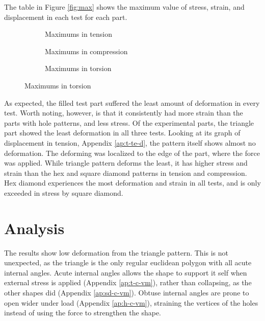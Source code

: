 \documentclass[12pt, letterpaper]{article}
\begin{document}
The table in Figure \ref{fig:max} shows the maximum value of stress, strain, and displacement in each test for each part. 

\begin{figure}[H]
	\centering
	\caption{Maximum values reached for displacement, stress, and strain, per test and part}
	\label{fig:max}
	\begin{subfigure}[b]{0.8\linewidth}
	\label{tab:tension}
	\caption{Maximums in tension}
	\end{subfigure}
	\begin{subfigure}[b]{0.8\linewidth}
	\label{tab:compression}
	\caption{Maximums in compression}
	\end{subfigure}
	\begin{subfigure}[b]{0.8\linewidth}
	\label{tab:torsion}
	\caption{Maximums in torsion}
	\end{subfigure}
\end{figure}

As expected, the filled test part suffered the least amount of deformation in every test. Worth noting, however, is that it consistently had more strain than the parts with hole patterns, and less stress. 
Of the experimental parts, the triangle part showed the least deformation in all three tests. Looking at its graph of displacement in tension, Appendix \ref{ap:t-te-d}, the pattern itself shows almost no deformation. The deforming was localized to the edge of the part, where the force was applied. While triangle pattern deforms the least, it has higher stress and strain than the hex and square diamond patterns in tension and compression.
Hex diamond experiences the most deformation and strain in all tests, and is only exceeded in stress by square diamond. 


\section{Analysis}
\label{sec:analysis}

The results show low deformation from the triangle pattern. This is not unexpected, as the triangle is the only regular euclidean polygon with all acute internal angles. Acute internal angles allows the shape to support it self when external stress is applied (Appendix \ref{ap:t-c-vm}), rather than collapsing, as the other shapes did (Appendix \ref{ap:sd-c-vm}). Obtuse internal angles are prone to open wider under load (Appendix \ref{ap:h-c-vm}), straining the vertices of the holes instead of using the force to strengthen the shape. 
\end{document}

